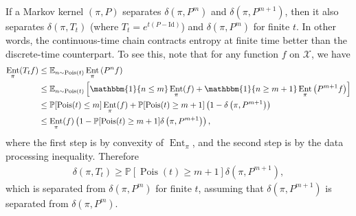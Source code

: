\documentclass[11pt]{article}
\def\bE{\mathbb{E}}
\def\bP{\mathbb{P}}
\def\cX{\mathcal{X}}
\DeclareMathOperator\Ent{\mathrm{Ent}}
\DeclareMathOperator\Pois{\mathrm{Pois}}
\theoremstyle{definition}
\begin{document}
If a Markov kernel $(\pi, P)$ separates $\delta\left(\pi, P^m\right)$ and $\delta\left(\pi, P^{m+1}\right)$, then it also separates $\delta(\pi, T_t)$ (where $T_t=e^{t(P-\mathrm{Id})}$) and $\delta\left(\pi, P^m\right)$ for finite $t$.
In other words, the continuous-time chain contracts entropy at finite time better than the discrete-time counterpart.
To see this, note that for any function $f$ on $\cX$, we have
\begin{align}
  \Ent_\pi(T_t f) &\le \bE_{n\sim \Pois(t)} \Ent_\pi\left(P^n f\right) \\
  \nonumber &\le \bE_{n\sim \Pois(t)}\left[ \mathbbm{1}\{n\le m\} \Ent_\pi(f) + \mathbbm{1}\{n\ge m+1\} \Ent_\pi\left(P^{m+1} f\right)\right]\\
  \nonumber &\le \bP[\Pois(t)\le m] \Ent_\pi(f) + \bP[\Pois(t) \ge m+1] \left(1-\delta\left(\pi, P^{m+1}\right)\right) \\
  \nonumber &\le \Ent_\pi(f) \left(1 - \bP[\Pois(t)\ge m+1] \delta\left(\pi, P^{m+1}\right)\right),
\end{align}
where the first step is by convexity of $\Ent_\pi$, and the second step is by the data processing inequality.
Therefore
\begin{align}
  \delta(\pi, T_t) \ge \bP[\Pois(t)\ge m+1] \delta\left(\pi, P^{m+1}\right),
\end{align}
which is separated from $\delta\left(\pi, P^m\right)$ for finite $t$, assuming that $\delta\left(\pi, P^{m+1}\right)$ is separated from $\delta\left(\pi, P^m\right)$.
\end{document}
